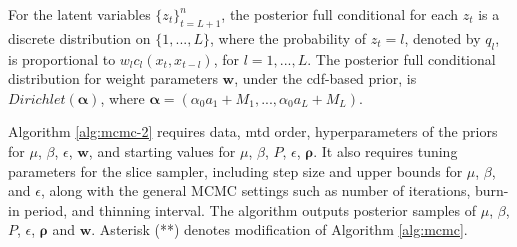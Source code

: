 \documentclass[
  letterpaper,
  double,
  12pt,
  1.0in]{beavtex}
\begin{document}
For the latent variables \({\{z_t\}}_{t=L+1}^n\), the posterior full
conditional for each \(z_t\) is a discrete distribution on
\(\{1, ..., L\}\), where the probability of \(z_t = l\), denoted by
\(q_l\), is proportional to \(w_l c_l (x_t, x_{t-l})\), for
\(l = 1,..., L\). The posterior full conditional distribution for weight
parameters \(\boldsymbol{w}\), under the cdf-based prior, is
\(Dirichlet (\boldsymbol{\alpha})\), where
\(\boldsymbol{\alpha} = (\alpha_0 a_1 + M_1, ..., \alpha_0 a_L + M_L)\).

Algorithm \ref{alg:mcmc-2} requires data, mtd order, hyperparameters of
the priors for \(\mu\), \(\beta\), \(\epsilon\), \(\boldsymbol{w}\), and
starting values for \(\mu\), \(\beta\), \(P\), \(\epsilon\),
\(\boldsymbol{\rho}\). It also requires tuning parameters for the slice
sampler, including step size and upper bounds for \(\mu\), \(\beta\),
and \(\epsilon\), along with the general MCMC settings such as number of
iterations, burn-in period, and thinning interval. The algorithm outputs
posterior samples of \(\mu\), \(\beta\), \(P\), \(\epsilon\),
\(\boldsymbol{\rho}\) and \(\boldsymbol{w}\). Asterisk (**) denotes
modification of Algorithm \ref{alg:mcmc}.
\end{document}
